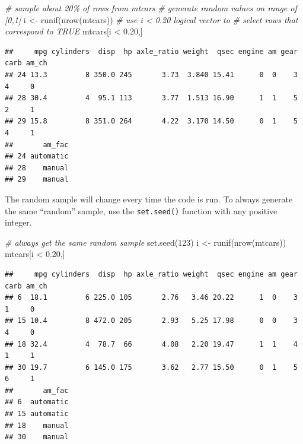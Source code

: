 \documentclass[
]{book}
\newenvironment{Shaded}{\begin{snugshade}}{\end{snugshade}}
\newcommand{\CommentTok}[1]{\textcolor[rgb]{0.56,0.35,0.01}{\textit{#1}}}
\newcommand{\DecValTok}[1]{\textcolor[rgb]{0.00,0.00,0.81}{#1}}
\newcommand{\FloatTok}[1]{\textcolor[rgb]{0.00,0.00,0.81}{#1}}
\newcommand{\FunctionTok}[1]{\textcolor[rgb]{0.00,0.00,0.00}{#1}}
\newcommand{\NormalTok}[1]{#1}
\newcommand{\OtherTok}[1]{\textcolor[rgb]{0.56,0.35,0.01}{#1}}
\newcommand{\SpecialCharTok}[1]{\textcolor[rgb]{0.00,0.00,0.00}{#1}}
\begin{document}
\begin{Shaded}
\begin{Highlighting}[]
\CommentTok{\# sample about 20\% of rows from mtcars}
\CommentTok{\# generate random values on range of [0,1]}
\NormalTok{i }\OtherTok{\textless{}{-}} \FunctionTok{runif}\NormalTok{(}\FunctionTok{nrow}\NormalTok{(mtcars))}
\CommentTok{\# use i \textless{} 0.20 logical vector to }
\CommentTok{\# select rows that correspond to TRUE}
\NormalTok{mtcars[i }\SpecialCharTok{\textless{}} \FloatTok{0.20}\NormalTok{,]}
\end{Highlighting}
\end{Shaded}

\begin{verbatim}
##     mpg cylinders  disp  hp axle_ratio weight  qsec engine am gear carb am_ch
## 24 13.3         8 350.0 245       3.73  3.840 15.41      0  0    3    4     0
## 28 30.4         4  95.1 113       3.77  1.513 16.90      1  1    5    2     1
## 29 15.8         8 351.0 264       4.22  3.170 14.50      0  1    5    4     1
##       am_fac
## 24 automatic
## 28    manual
## 29    manual
\end{verbatim}

The random sample will change every time the code is run. To always generate the same ``random'' sample, use the \texttt{set.seed()} function with any positive integer.

\begin{Shaded}
\begin{Highlighting}[]
\CommentTok{\# always get the same random sample}
\FunctionTok{set.seed}\NormalTok{(}\DecValTok{123}\NormalTok{)}
\NormalTok{i }\OtherTok{\textless{}{-}} \FunctionTok{runif}\NormalTok{(}\FunctionTok{nrow}\NormalTok{(mtcars))}
\NormalTok{mtcars[i }\SpecialCharTok{\textless{}} \FloatTok{0.20}\NormalTok{,]}
\end{Highlighting}
\end{Shaded}

\begin{verbatim}
##     mpg cylinders  disp  hp axle_ratio weight  qsec engine am gear carb am_ch
## 6  18.1         6 225.0 105       2.76   3.46 20.22      1  0    3    1     0
## 15 10.4         8 472.0 205       2.93   5.25 17.98      0  0    3    4     0
## 18 32.4         4  78.7  66       4.08   2.20 19.47      1  1    4    1     1
## 30 19.7         6 145.0 175       3.62   2.77 15.50      0  1    5    6     1
##       am_fac
## 6  automatic
## 15 automatic
## 18    manual
## 30    manual
\end{verbatim}
\end{document}
